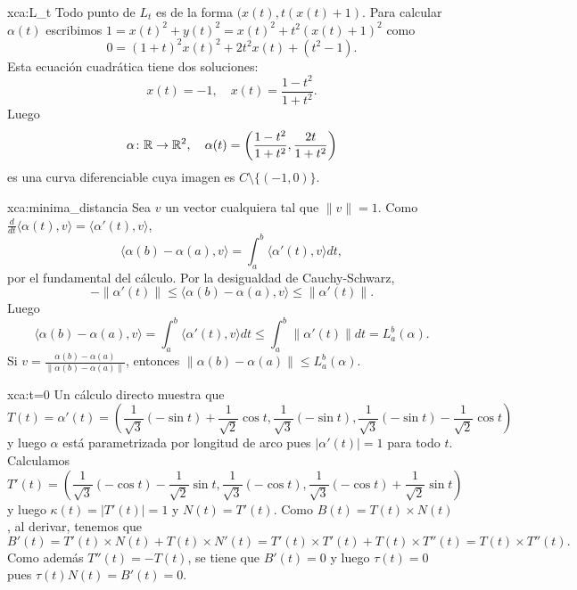 \begin{sol}{xca:L_t}
	Todo punto de $L_t$ es de la forma $(x(t),t(x(t)+1)$. Para calcular
	$\alpha(t)$ escribimos 
	$1=x(t)^2+y(t)^2=x(t)^2+t^2(x(t)+1)^2$ 
	como
	\[
		0=(1+t)^2x(t)^2+2t^2x(t)+(t^2-1).
	\]
	Esta ecuación cuadrática tiene dos soluciones:
	\[
		x(t)=-1,\quad
		x(t)=\frac{1-t^2}{1+t^2}.
	\]
	Luego  
	\[
		\alpha\colon\mathbb{R}\to\mathbb{R}^2,\quad
		\alpha(t)=\left(\frac{1-t^2}{1+t^2},\frac{2t}{1+t^2}\right)
	\]
	es una curva diferenciable cuya imagen es $C\setminus\{(-1,0)\}$. 
\end{sol}

\begin{sol}{xca:minima_distancia}
	Sea $v$ un vector cualquiera tal que $\|v\|=1$. Como
	$\frac{d}{dt}\langle\alpha(t),v\rangle=\langle\alpha'(t),v\rangle$, 
	\[
		\langle\alpha(b)-\alpha(a),v\rangle
		=\int_a^b\langle\alpha'(t),v\rangle dt,
	\]
	por el fundamental del cálculo. Por la desigualdad de Cauchy-Schwarz, 
	\[	
		-\|\alpha'(t)\|\leq \langle\alpha(b)-\alpha(a),v\rangle\leq\|\alpha'(t)\|.
	\]
	Luego 
	\[
		\langle\alpha(b)-\alpha(a),v\rangle
		=\int_a^b\langle\alpha'(t),v\rangle dt\leq\int_a^b\|\alpha'(t)\|dt=L_a^b(\alpha).
	\]
	Si 
	$v=\frac{\alpha(b)-\alpha(a)}{\|\alpha(b)-\alpha(a)\|}$, entonces 
	$\|\alpha(b)-\alpha(a)\|\leq L_a^b(\alpha)$.
\end{sol}



\begin{sol}{xca:t=0}
	Un cálculo directo muestra que
	\[
		T(t)=\alpha'(t)=\left(\frac{1}{\sqrt{3}}(-\sin t)+\frac{1}{\sqrt{2}}\cos t,\frac{1}{\sqrt{3}}(-\sin t),\frac{1}{\sqrt{3}}(-\sin t)-\frac{1}{\sqrt{2}}\cos t\right)
	\]
	y luego $\alpha$ está parametrizada por longitud de arco pues
	$|\alpha'(t)|=1$ para todo $t$. Calculamos 
	\[
		T'(t)=\left(\frac{1}{\sqrt{3}}(-\cos t)-\frac{1}{\sqrt{2}}\sin t,\frac{1}{\sqrt{3}}(-\cos t),\frac{1}{\sqrt{3}}(-\cos t)+\frac{1}{\sqrt{2}}\sin t\right)
	\]
	y luego $\kappa(t)=|T'(t)|=1$ y $N(t)=T'(t)$. Como $B(t)=T(t)\times N(t)$, al derivar, tenemos que
	\[
		B'(t)=T'(t)\times N(t)+T(t)\times N'(t)=T'(t)\times T'(t)+T(t)\times T''(t)=T(t)\times T''(t).
	\]
	Como además $T''(t)=-T(t)$, se tiene que $B'(t)=0$ y luego $\tau(t)=0$ pues $\tau(t)N(t)=B'(t)=0$.
\end{sol}

